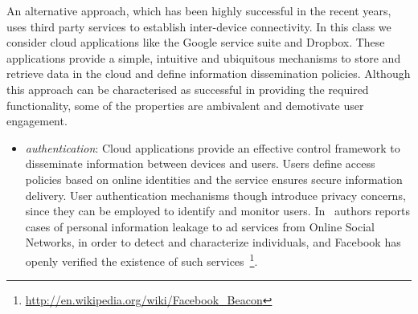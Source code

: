 An alternative approach, which has been highly successful in the recent years,
uses third party services to establish inter-device connectivity.  In this class
we consider cloud applications like the Google service suite and Dropbox. These
applications provide a simple, intuitive and ubiquitous mechanisms to store and
retrieve data in the cloud and define information dissemination policies.
Although this approach can be characterised as successful in providing the
required functionality, some of the properties are ambivalent and demotivate
user engagement. 

\begin{itemize}
  \item{\it authentication}: Cloud applications provide an effective control
       framework to disseminate information between devices and users.  Users
       define access policies based on online identities and the service ensures
       secure information delivery.  User authentication mechanisms though
       introduce privacy concerns, since they can be employed to identify and
       monitor users.  In~\cite{Krishnamurthy2009} authors reports cases of
       personal information leakage to ad services from Online Social Networks,
       in order to detect and characterize individuals, and Facebook has openly
       verified the existence of such
       services~\footnote{\url{http://en.wikipedia.org/wiki/Facebook_Beacon}}. 



\end{itemize}
